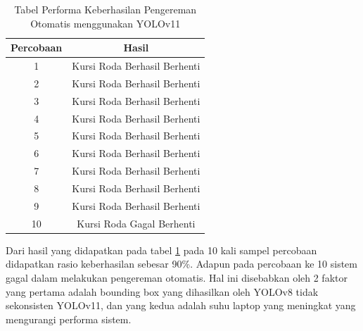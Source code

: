 \begin{table}[H]
  \centering
  \caption{Tabel Performa Keberhasilan Pengereman Otomatis menggunakan YOLOv11}
  \label{tb:tabelyolov8performa}
  \begin{tabular}{|c|c|}
    \hline
    Percobaan & Hasil                                                \\ \hline
    1         & \cellcolor[HTML]{34FF34}Kursi Roda Berhasil Berhenti \\ \hline
    2         & \cellcolor[HTML]{34FF34}Kursi Roda Berhasil Berhenti \\ \hline
    3         & \cellcolor[HTML]{34FF34}Kursi Roda Berhasil Berhenti \\ \hline
    4         & \cellcolor[HTML]{34FF34}Kursi Roda Berhasil Berhenti \\ \hline
    5         & \cellcolor[HTML]{34FF34}Kursi Roda Berhasil Berhenti \\ \hline
    6         & \cellcolor[HTML]{34FF34}Kursi Roda Berhasil Berhenti \\ \hline
    7         & \cellcolor[HTML]{34FF34}Kursi Roda Berhasil Berhenti \\ \hline
    8         & \cellcolor[HTML]{34FF34}Kursi Roda Berhasil Berhenti \\ \hline
    9         & \cellcolor[HTML]{34FF34}Kursi Roda Berhasil Berhenti \\ \hline
    10        & \cellcolor[HTML]{FD6864}Kursi Roda Gagal Berhenti    \\ \hline
    \end{tabular}
  \end{table}

Dari hasil yang didapatkan pada tabel \ref{tb:tabelyolov8performa} pada 10 kali sampel percobaan didapatkan rasio keberhasilan sebesar 90\%. Adapun pada percobaan ke 10 sistem gagal dalam melakukan pengereman otomatis. Hal ini disebabkan oleh 2 faktor yang pertama adalah bounding box yang dihasilkan oleh YOLOv8 tidak sekonsisten YOLOv11, dan yang kedua adalah suhu laptop yang meningkat yang mengurangi performa sistem.

